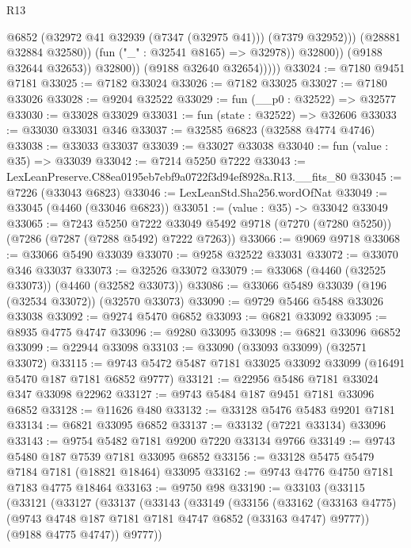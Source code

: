 \begin{lexlean}{R13}
\begin{coremodule}
                              @6852
                              (@32972 @41 @32939 (@7347 (@32975 @41)))
                              (@7379 @32952)))
                          (@28881 @32884 @32580))
                        (fun ("_" : @32541 @8165) => @32978))
                      @32800))
                  (@9188 @32644 @32653))
                @32800))
            (@9188 @32640 @32654)))))
@33024 := @7180 @9451 @7181
@33025 := @7182 @33024
@33026 := @7182 @33025
@33027 := @7180 @33026
@33028 := @9204 @32522
@33029 := fun (__p0 : @32522) => @32577
@33030 := @33028 @33029
@33031 := fun (state : @32522) => @32606
@33033 := @33030 @33031 @346
@33037 := @32585 @6823 (@32588 @4774 @4746)
@33038 := @33033 @33037
@33039 := @33027 @33038
@33040 := fun (value : @35) => @33039
@33042 := @7214 @5250 @7222
@33043 := LexLeanPreserve.C88ea0195eb7ebf9a0722f3d94ef8928a.R13.__fits_80
@33045 := @7226 (@33043 @6823)
@33046 := LexLeanStd.Sha256.wordOfNat
@33049 := @33045 (@4460 (@33046 @6823))
@33051 := (value : @35) -> @33042 @33049
@33065 := @7243
    @5250
    @7222
    @33049
    @5492
    @9718
    (@7270 (@7280 @5250))
    (@7286 (@7287 (@7288 @5492) @7222 @7263))
@33066 := @9069 @9718
@33068 := @33066 @5490 @33039
@33070 := @9258 @32522 @33031
@33072 := @33070 @346 @33037
@33073 := @32526 @33072
@33079 := @33068 (@4460 (@32525 @33073)) (@4460 (@32582 @33073))
@33086 := @33066 @5489 @33039 (@196 (@32534 @33072)) (@32570 @33073)
@33090 := @9729 @5466 @5488 @33026 @33038
@33092 := @9274 @5470 @6852
@33093 := @6821 @33092
@33095 := @8935 @4775 @4747
@33096 := @9280 @33095
@33098 := @6821 @33096 @6852
@33099 := @22944 @33098
@33103 := @33090 (@33093 @33099) (@32571 @33072)
@33115 := @9743 @5472 @5487 @7181 @33025 @33092 @33099 (@16491 @5470 @187 @7181 @6852 @9777)
@33121 := @22956 @5486 @7181 @33024 @347 @33098 @22962
@33127 := @9743 @5484 @187 @9451 @7181 @33096 @6852
@33128 := @11626 @480
@33132 := @33128 @5476 @5483 @9201 @7181
@33134 := @6821 @33095 @6852
@33137 := @33132 (@7221 @33134) @33096
@33143 := @9754 @5482 @7181 @9200 @7220 @33134 @9766
@33149 := @9743 @5480 @187 @7539 @7181 @33095 @6852
@33156 := @33128 @5475 @5479 @7184 @7181 (@18821 @18464) @33095
@33162 := @9743 @4776 @4750 @7181 @7183 @4775 @18464
@33163 := @9750 @98
@33190 := @33103
    (@33115
      (@33121
        (@33127
          (@33137
            (@33143
              (@33149
                (@33156
                  (@33162
                    (@33163 @4775)
                    (@9743 @4748 @187 @7181 @7181 @4747 @6852 (@33163 @4747) @9777))
                  (@9188 @4775 @4747))
                @9777))

\end{coremodule}
\end{lexlean}
